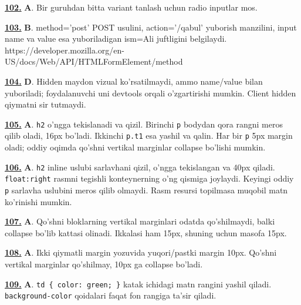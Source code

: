 \documentclass[10pt,a4paper,oneside]{article}
\begin{document}
\noindent\hyperlink{q102}{\textbf{102.}} \textbf{A}.  Bir guruhdan bitta variant tanlash uchun radio inputlar mos.
\par\vspace{3mm}
\noindent\hyperlink{q103}{\textbf{103.}} \textbf{B}.  method='post' POST usulini, action='/qabul' yuborish manzilini, input name va value esa yuboriladigan ism=Ali juftligini belgilaydi. https://developer.mozilla.org/en-US/docs/Web/API/HTMLFormElement/method
\par\vspace{3mm}
\noindent\hyperlink{q104}{\textbf{104.}} \textbf{D}.  Hidden maydon vizual ko'rsatilmaydi, ammo name/value bilan yuboriladi; foydalanuvchi uni devtools orqali o'zgartirishi mumkin. Client hidden qiymatni sir tutmaydi.
\par\vspace{3mm}
\noindent\hyperlink{q105}{\textbf{105.}} \textbf{A}.  \texttt{h2} o'ngga tekislanadi va qizil. Birinchi \texttt{p} bodydan qora rangni meros qilib oladi, 16px bo'ladi. Ikkinchi \texttt{p.t1} esa yashil va qalin. Har bir \texttt{p} 5px margin oladi; oddiy oqimda qo'shni vertikal marginlar collapse bo'lishi mumkin.
\par\vspace{3mm}
\noindent\hyperlink{q106}{\textbf{106.}} \textbf{A}.  \texttt{h2} inline uslubi sarlavhani qizil, o'ngga tekislangan va 40px qiladi. \texttt{float:right} rasmni tegishli konteynerning o'ng qismiga joylaydi. Keyingi oddiy \texttt{p} sarlavha uslubini meros qilib olmaydi. Rasm resursi topilmasa muqobil matn ko'rinishi mumkin.
\par\vspace{3mm}
\noindent\hyperlink{q107}{\textbf{107.}} \textbf{A}.  Qo'shni bloklarning vertikal marginlari odatda qo'shilmaydi, balki collapse bo'lib kattasi olinadi. Ikkalasi ham 15px, shuning uchun masofa 15px.
\par\vspace{3mm}
\noindent\hyperlink{q108}{\textbf{108.}} \textbf{A}.  Ikki qiymatli margin yozuvida yuqori/pastki margin 10px. Qo'shni vertikal marginlar qo'shilmay, 10px ga collapse bo'ladi.
\par\vspace{3mm}
\noindent\hyperlink{q109}{\textbf{109.}} \textbf{A}.  \texttt{td \{ color: green; \}} katak ichidagi matn rangini yashil qiladi. \texttt{background-color} qoidalari faqat fon rangiga ta'sir qiladi.
\end{document}
